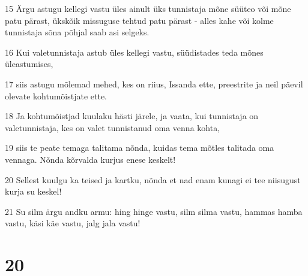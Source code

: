 \par 15 Ärgu astugu kellegi vastu üles ainult üks tunnistaja mõne süüteo või mõne patu pärast, ükskõik missuguse tehtud patu pärast - alles kahe või kolme tunnistaja sõna põhjal saab asi selgeks.
\par 16 Kui valetunnistaja astub üles kellegi vastu, süüdistades teda mõnes üleastumises,
\par 17 siis astugu mõlemad mehed, kes on riius, Issanda ette, preestrite ja neil päevil olevate kohtumõistjate ette.
\par 18 Ja kohtumõistjad kuulaku hästi järele, ja vaata, kui tunnistaja on valetunnistaja, kes on valet tunnistanud oma venna kohta,
\par 19 siis te peate temaga talitama nõnda, kuidas tema mõtles talitada oma vennaga. Nõnda kõrvalda kurjus enese keskelt!
\par 20 Sellest kuulgu ka teised ja kartku, nõnda et nad enam kunagi ei tee niisugust kurja su keskel!
\par 21 Su silm ärgu andku armu: hing hinge vastu, silm silma vastu, hammas hamba vastu, käsi käe vastu, jalg jala vastu!

\chapter{20}

